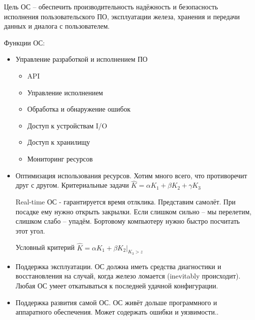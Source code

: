 \documentclass{book}
\theoremstyle{definition}
\begin{document}
    \begin{definition}
        Цель ОС -- обеспечить производительность надёжность и безопасность исполнения пользовательского ПО, эксплуатации железа, хранения и передачи данных и диалога с пользователем.
    \end{definition}

    Функции ОС:
    \begin{itemize}
        \item Управление разработкой и исполнением ПО
            \begin{itemize}
                \item API
                \item Управление исполнением
                \item Обработка и обнаружение ошибок
                \item Доступ к устройствам I/O
                \item Доступ к хранилищу
                \item Мониторинг ресурсов
            \end{itemize}
        \item Оптимизация использования ресурсов. Хотим много всего, что противоречит друг с другом. Критериальные задачи $\hat K = \alpha K_1 + \beta K_2 + \gamma K_3$

            Real-time ОС - гарантируется время отлклика. Представим самолёт. При посадке ему нужно открыть закрылки. Если слишком сильно -- мы перелетим,  слишком слабо -- упадём. Бортовому компьютеру нужно быстро посчитать этот угол.

            Условный критерий $\hat K = \alpha K_1 + \beta K_2|_{K_3>z}$
        \item Поддержка эксплуатации. ОС должна иметь средства диагностики и восстановления на случай, когда железо ломается (inevitably происходит). Любая ОС умеет откатываться к последней удачной конфигурации.
        \item Поддержка развития самой ОС. ОС живёт дольше программного и аппаратного обеспечения. Может содержать ошибки и уязвимости..
    \end{itemize}
\end{document}
